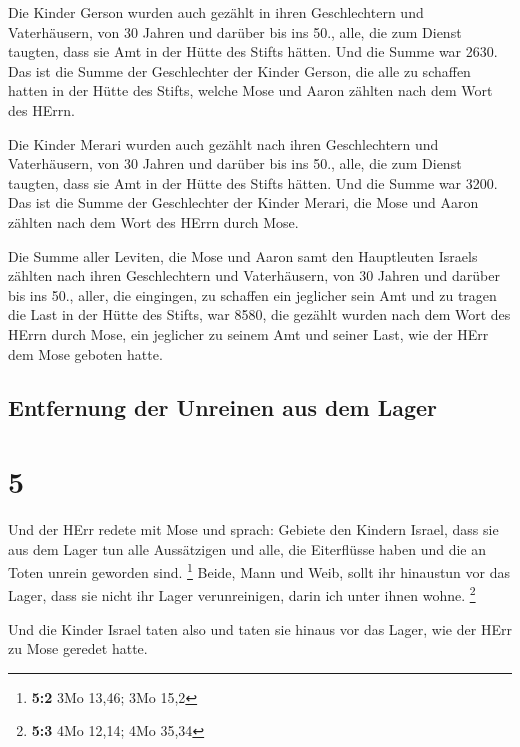  Die Kinder Gerson wurden auch gezählt in ihren
Geschlechtern und Vaterhäusern,  von 30 Jahren und
darüber bis ins 50., alle, die zum Dienst taugten, dass sie Amt in der
Hütte des Stifts hätten.  Und die Summe war 2630.
 Das ist die Summe der Geschlechter der Kinder Gerson,
die alle zu schaffen hatten in der Hütte des Stifts, welche Mose und
Aaron zählten nach dem Wort des HErrn.

 Die Kinder Merari wurden auch gezählt nach ihren
Geschlechtern und Vaterhäusern,  von 30 Jahren und
darüber bis ins 50., alle, die zum Dienst taugten, dass sie Amt in der
Hütte des Stifts hätten.  Und die Summe war 3200.
 Das ist die Summe der Geschlechter der Kinder Merari,
die Mose und Aaron zählten nach dem Wort des HErrn durch Mose.

 Die Summe aller Leviten, die Mose und Aaron samt den
Hauptleuten Israels zählten nach ihren Geschlechtern und Vaterhäusern,
 von 30 Jahren und darüber bis ins 50., aller, die
eingingen, zu schaffen ein jeglicher sein Amt und zu tragen die Last in
der Hütte des Stifts,  war 8580,  die
gezählt wurden nach dem Wort des HErrn durch Mose, ein jeglicher zu
seinem Amt und seiner Last, wie der HErr dem Mose geboten hatte.

\hypertarget{entfernung-der-unreinen-aus-dem-lager}{%
\subsection{Entfernung der Unreinen aus dem
Lager}\label{entfernung-der-unreinen-aus-dem-lager}}

\hypertarget{section-4}{%
\section{5}\label{section-4}}

 Und der HErr redete mit Mose und sprach: 
Gebiete den Kindern Israel, dass sie aus dem Lager tun alle Aussätzigen
und alle, die Eiterflüsse haben und die an Toten unrein geworden sind.
\footnote{\textbf{5:2} 3Mo 13,46; 3Mo 15,2}  Beide, Mann
und Weib, sollt ihr hinaustun vor das Lager, dass sie nicht ihr Lager
verunreinigen, darin ich unter ihnen wohne. \footnote{\textbf{5:3} 4Mo
  12,14; 4Mo 35,34}

 Und die Kinder Israel taten also und taten sie hinaus vor
das Lager, wie der HErr zu Mose geredet hatte.

